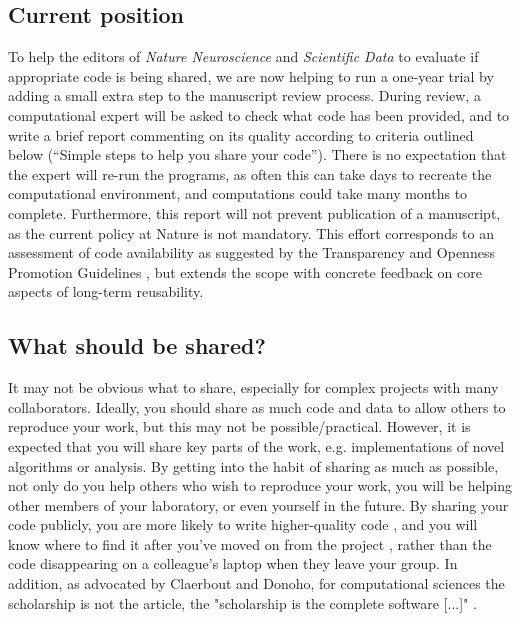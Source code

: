 \documentclass[11pt]{article}
\begin{document}
\subsection*{Current position}

To help the editors of \textit{Nature Neuroscience} and
\textit{Scientific Data} to evaluate if appropriate code is being
shared, we are now helping to run a one-year trial by adding a small
extra step to the manuscript review process.  During review, a
computational expert will be asked to check what code has been
provided, and to write a brief report commenting on its quality
according to criteria outlined below (``Simple steps to help you share
your code'').  There is no expectation that the expert will re-run the
programs, as often this can take days to recreate the computational
environment, and computations could take many months to complete.
Furthermore, this report will not prevent publication of a manuscript, as the current policy at Nature is not mandatory.
This effort corresponds to an assessment of code availability as suggested by
the Transparency and Openness Promotion Guidelines \cite{Nosek2015}, but
extends the scope with concrete feedback on core aspects of long-term reusability.


\subsection*{What should be shared?}

It may not be obvious what to share, especially for complex projects with many collaborators.  Ideally,
you should share as much code and data to allow others to reproduce
your work,  but this may not be possible/practical.  However, it
is expected that you will share key parts of the work, e.g. implementations of novel algorithms or analysis.  By getting into the habit of sharing as much as possible, not only do you help others who wish to reproduce your work, you will be helping other members of your laboratory, or even yourself in the future.  By sharing your code publicly, you are more likely to write higher-quality code \cite{Easterbrook2014}, and you will know where to find it after you've moved on from the project \cite{Halchenko2015}, rather than the code disappearing on a colleague's laptop when they leave your group. In addition, as advocated by Claerbout and Donoho, for computational sciences the scholarship is not the article, the "scholarship is the complete software [...]" \cite{claerbout_electronic_1992,donoho_invitation_2010}.
\end{document}
